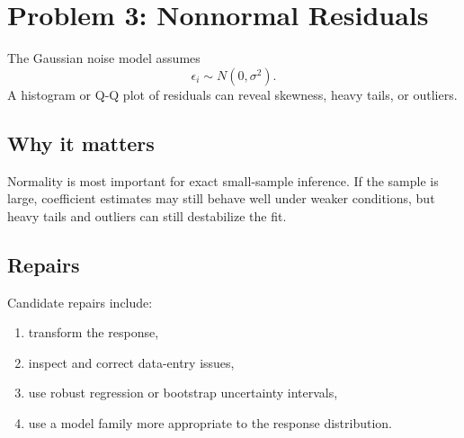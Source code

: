 \section{Problem 3: Nonnormal Residuals}

The Gaussian noise model assumes
\begin{equation}
  \epsilon_i\sim N(0,\sigma^2).
\end{equation}
A histogram or Q-Q plot of residuals can reveal skewness, heavy tails, or outliers.

\subsection*{Why it matters}

Normality is most important for exact small-sample inference.  If the sample is large, coefficient estimates may still behave well under weaker conditions, but heavy tails and outliers can still destabilize the fit.

\subsection*{Repairs}

Candidate repairs include:
\begin{enumerate}
  \item transform the response,
  \item inspect and correct data-entry issues,
  \item use robust regression or bootstrap uncertainty intervals,
  \item use a model family more appropriate to the response distribution.
\end{enumerate}

